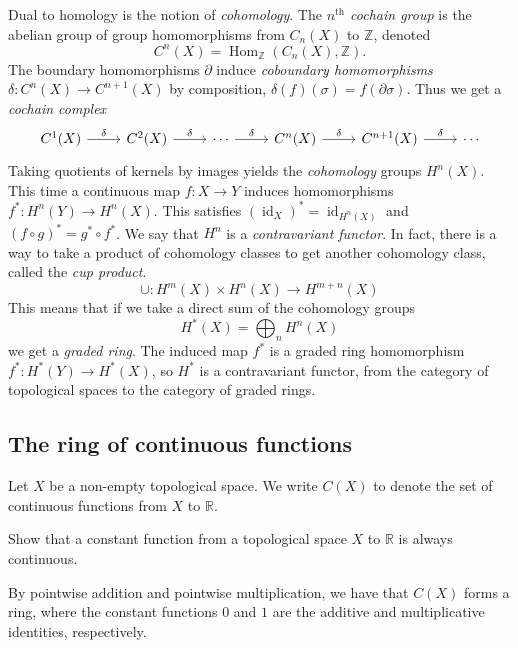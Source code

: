 \documentclass[a4paper,11pt]{article}
\begin{document}
      Dual to homology is the notion of \textit{cohomology}. The \textit{\(n^\text{th}\) cochain group} is the abelian group of group homomorphisms from \(C_n(X)\) to \(\mathbb{Z}\), denoted
      \[
        C^n(X) = \operatorname{Hom}_{\mathbb{Z} }(C_n(X), \mathbb{Z}).
      \]
      The boundary homomorphisms \(\partial\) induce \textit{coboundary homomorphisms} \(\delta: C^n(X) \to C^{n+1}(X)\) by composition, \(\delta(f)(\sigma) = f(\partial \sigma)\). Thus we get a \textit{cochain complex}
      \[
        \begin{tikzcd}
          C^1(X) \arrow[r,"\delta"] & C^2(X) \arrow[r,"\delta"] & \cdots \arrow[r,"\delta"] & C^n(X) \arrow[r,"\delta"] & C^{n+1}(X) \arrow[r,"\delta"] & \cdots
        \end{tikzcd}
      \]
      Taking quotients of kernels by images yields the \textit{cohomology} groups \(H^n(X)\). This time a continuous map \(f: X \to Y\) induces homomorphisms \(f^*: H^n(Y) \to H^n(X)\). This satisfies \((\operatorname{id}_X)^* = \operatorname{id}_{H^n(X)}\) and \((f \circ g)^* = g^* \circ f^*\). We say that \(H^n\) is a \textit{contravariant functor}. In fact, there is a way to take a product of cohomology classes to get another cohomology class, called the \textit{cup product}.
      \[
        \cup: H^m(X) \times H^n(X) \to H^{m+n}(X)
      \]
      This means that if we take a direct sum of the cohomology groups
      \[
        H^*(X) = \bigoplus_n H^n(X)
      \]
      we get a \textit{graded ring}. The induced map \(f^*\) is a graded ring homomorphism \(f^*: H^*(Y) \to H^*(X)\), so \(H^*\) is a contravariant functor, from the category of topological spaces to the category of graded rings.

    \subsection{The ring of continuous functions}
    Let \(X\) be a non-empty topological space. We write \(C(X)\) to denote the set of continuous functions from \(X\) to \(\mathbb{R}\).

    \begin{exercise}
      Show that a constant function from a topological space \(X\) to \(\mathbb{R}\) is always continuous.
    \end{exercise}

    By pointwise addition and pointwise multiplication, we have that \(C(X)\) forms a ring, where the constant functions \(0\) and \(1\) are the additive and multiplicative identities, respectively.
\end{document}
